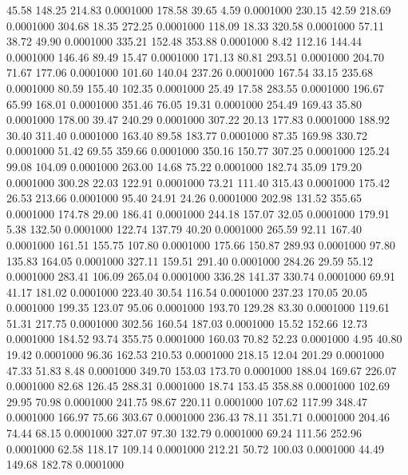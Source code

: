   45.58  148.25  214.83   0.0001000
 178.58   39.65    4.59   0.0001000
 230.15   42.59  218.69   0.0001000
 304.68   18.35  272.25   0.0001000
 118.09   18.33  320.58   0.0001000
  57.11   38.72   49.90   0.0001000
 335.21  152.48  353.88   0.0001000
   8.42  112.16  144.44   0.0001000
 146.46   89.49   15.47   0.0001000
 171.13   80.81  293.51   0.0001000
 204.70   71.67  177.06   0.0001000
 101.60  140.04  237.26   0.0001000
 167.54   33.15  235.68   0.0001000
  80.59  155.40  102.35   0.0001000
  25.49   17.58  283.55   0.0001000
 196.67   65.99  168.01   0.0001000
 351.46   76.05   19.31   0.0001000
 254.49  169.43   35.80   0.0001000
 178.00   39.47  240.29   0.0001000
 307.22   20.13  177.83   0.0001000
 188.92   30.40  311.40   0.0001000
 163.40   89.58  183.77   0.0001000
  87.35  169.98  330.72   0.0001000
  51.42   69.55  359.66   0.0001000
 350.16  150.77  307.25   0.0001000
 125.24   99.08  104.09   0.0001000
 263.00   14.68   75.22   0.0001000
 182.74   35.09  179.20   0.0001000
 300.28   22.03  122.91   0.0001000
  73.21  111.40  315.43   0.0001000
 175.42   26.53  213.66   0.0001000
  95.40   24.91   24.26   0.0001000
 202.98  131.52  355.65   0.0001000
 174.78   29.00  186.41   0.0001000
 244.18  157.07   32.05   0.0001000
 179.91    5.38  132.50   0.0001000
 122.74  137.79   40.20   0.0001000
 265.59   92.11  167.40   0.0001000
 161.51  155.75  107.80   0.0001000
 175.66  150.87  289.93   0.0001000
  97.80  135.83  164.05   0.0001000
 327.11  159.51  291.40   0.0001000
 284.26   29.59   55.12   0.0001000
 283.41  106.09  265.04   0.0001000
 336.28  141.37  330.74   0.0001000
  69.91   41.17  181.02   0.0001000
 223.40   30.54  116.54   0.0001000
 237.23  170.05   20.05   0.0001000
 199.35  123.07   95.06   0.0001000
 193.70  129.28   83.30   0.0001000
 119.61   51.31  217.75   0.0001000
 302.56  160.54  187.03   0.0001000
  15.52  152.66   12.73   0.0001000
 184.52   93.74  355.75   0.0001000
 160.03   70.82   52.23   0.0001000
   4.95   40.80   19.42   0.0001000
  96.36  162.53  210.53   0.0001000
 218.15   12.04  201.29   0.0001000
  47.33   51.83    8.48   0.0001000
 349.70  153.03  173.70   0.0001000
 188.04  169.67  226.07   0.0001000
  82.68  126.45  288.31   0.0001000
  18.74  153.45  358.88   0.0001000
 102.69   29.95   70.98   0.0001000
 241.75   98.67  220.11   0.0001000
 107.62  117.99  348.47   0.0001000
 166.97   75.66  303.67   0.0001000
 236.43   78.11  351.71   0.0001000
 204.46   74.44   68.15   0.0001000
 327.07   97.30  132.79   0.0001000
  69.24  111.56  252.96   0.0001000
  62.58  118.17  109.14   0.0001000
 212.21   50.72  100.03   0.0001000
  44.49  149.68  182.78   0.0001000
